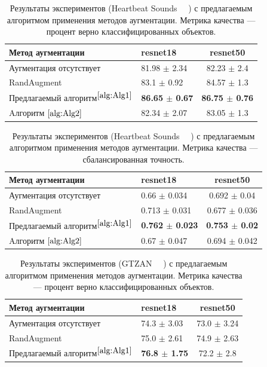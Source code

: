 \documentclass[12pt, fleqn]{article}
\begin{document}
\begin{table}[ht!]
    \centering
	\begin{tabular}{| l | l | c |}
    	\hline
	    Метод аугментации & resnet18 & resnet50 \\ \hline
	    Аугментация отсутствует  & 81.98 $\pm$ 2.34 & 82.23 $\pm$ 2.4 \\ \hline
	    RandAugment ~\cite{RandAugment} & 83.1 $\pm$ 0.92 & 84.57 $\pm$ 1.3 \\ \hline
	    Предлагаемый алгоритм$^{\ref{alg:Alg1}}$ & \textbf{86.65 $\pm$ 0.67} & \textbf{86.75 $\pm$ 0.76} \\ \hline
	    Aлгоритм ${\ref{alg:Alg2}}$ & 82.34 $\pm$ 2.07 & 83.05 $\pm$ 1.3 \\ \hline
	\end{tabular}
	\caption{Результаты экспериментов (Heartbeat Sounds ~\cite{HeartbeatSoundsArticle}~\cite{HeartbeatSoundsKaggle}) с предлагаемым алгоритмом применения методов аугментации. Метрика качества --- процент верно классифицированных объектов.}
	\label{table:lukianov_pavel_t5}
\end{table}

\begin{table}[ht!]
    \centering
	\begin{tabular}{| l | l | c |}
    	\hline
	    Метод аугментации & resnet18 & resnet50 \\ \hline
	    Аугментация отсутствует  & 0.66 $\pm$ 0.034 & 0.692 $\pm$ 0.04 \\ \hline
	    RandAugment ~\cite{RandAugment} & 0.713 $\pm$ 0.031 & 0.677 $\pm$ 0.036 \\ \hline
	    Предлагаемый алгоритм$^{\ref{alg:Alg1}}$ & \textbf{0.762 $\pm$ 0.023} & \textbf{0.753 $\pm$ 0.02} \\ \hline
	    Aлгоритм ${\ref{alg:Alg2}}$ & 0.67 $\pm$ 0.047 & 0.694 $\pm$ 0.042 \\ \hline
	\end{tabular}
	\caption{Результаты экспериментов (Heartbeat Sounds ~\cite{HeartbeatSoundsArticle}~\cite{HeartbeatSoundsKaggle}) с предлагаемым алгоритмом применения методов аугментации. Метрика качества --- сбалансированная точность.}
	\label{table:lukianov_pavel_t6}
\end{table}

\begin{table}[ht!]
    \centering
	\begin{tabular}{| l | l | c |}
    	\hline
	    Метод аугментации & resnet18 & resnet50 \\ \hline
	    Аугментация отсутствует  & 74.3 $\pm$ 3.03 & 73.0 $\pm$ 3.24 \\ \hline
	    RandAugment ~\cite{RandAugment} & 75.0 $\pm$ 2.61 & 74.9 $\pm$ 2.63 \\ \hline
	    Предлагаемый алгоритм$^{\ref{alg:Alg1}}$ & \textbf{76.8 $\pm$ 1.75} & 72.2 $\pm$ 2.8 \\ \hline
	\end{tabular}
	\caption{Результаты экспериментов (GTZAN ~\cite{GTZAN_Article}~\cite{GTZAN_kaggle}) с предлагаемым алгоритмом применения методов аугментации. Метрика качества --- процент верно классифицированных объектов.}
	\label{table:lukianov_pavel_t7}
\end{table}
\end{document}
